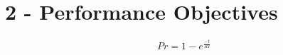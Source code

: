 \hypertarget{performance-objectives}{%
\section{2 - Performance Objectives}\label{performance-objectives}}

\[Pr = 1-e^{\frac{-t}{RI}}\]

